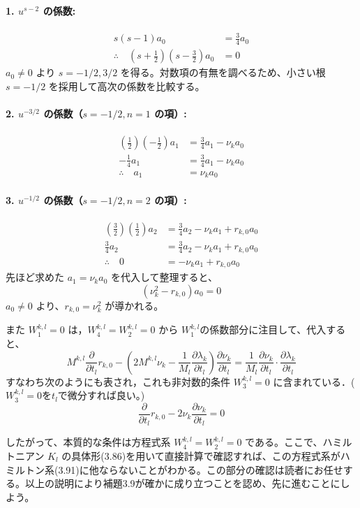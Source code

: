 \paragraph{1. $u^{s-2}$ の係数:}
\begin{align*}
    s(s-1) a_0 &= \frac{3}{4} a_0 \\
    \therefore \quad \left(s + \frac{1}{2}\right)\left(s - \frac{3}{2}\right) a_0 &= 0
\end{align*}
$a_0 \neq 0$ より $s = -1/2, 3/2$ を得る。対数項の有無を調べるため、小さい根 $s = -1/2$ を採用して高次の係数を比較する。

\paragraph{2. $u^{-3/2}$ の係数（$s=-1/2, n=1$ の項）:}
\begin{align*}
    \left(\frac{1}{2}\right)\left(-\frac{1}{2}\right) a_1 &= \frac{3}{4} a_1 - \nu_k a_0 \\
    -\frac{1}{4} a_1 &= \frac{3}{4} a_1 - \nu_k a_0 \\
    \therefore \quad a_1 &= \nu_k a_0
\end{align*}

\paragraph{3. $u^{-1/2}$ の係数（$s=-1/2, n=2$ の項）:}
\begin{align*}
    \left(\frac{3}{2}\right)\left(\frac{1}{2}\right) a_2 &= \frac{3}{4} a_2 - \nu_k a_1 + r_{k,0} a_0 \\
    \frac{3}{4} a_2 &= \frac{3}{4} a_2 - \nu_k a_1 + r_{k,0} a_0 \\
    \therefore \quad 0 &= -\nu_k a_1 + r_{k,0} a_0
\end{align*}
先ほど求めた $a_1 = \nu_k a_0$ を代入して整理すると、
\begin{equation*}
    (\nu_k^2 - r_{k,0}) a_0 = 0
\end{equation*}
$a_0 \neq 0$ より、$r_{k,0} = \nu_k^2$ が導かれる。
\begin{story}
また $W_1^{k,l}=0$ は，$W_4^{k,l}=W_2^{k,l}=0$ から $W_1^{k,l}$の係数部分に注目して、代入すると、
\[
    M^{k,l} \frac{\partial}{\partial t_l} r_{k,0} - \left( 2M^{k,l}\nu_k - \frac{1}{M_l} \frac{\partial \lambda_k}{\partial t_l} \right) \frac{\partial \nu_k}{\partial t_l} = \frac{1}{M_l} \frac{\partial \nu_k}{\partial t_l} \cdot \frac{\partial \lambda_k}{\partial t_l}
\]
すなわち次のようにも表され，これも非対数的条件 $W_3^{k,l}=0$ に含まれている．($W_3^{k,l}=0$を$t_{l}$で微分すれば良い。)
\begin{equation}
    \frac{\partial}{\partial t_l} r_{k,0} - 2\nu_k \frac{\partial \nu_k}{\partial t_l} = 0 \label{eq:rk0_derivative}
\end{equation}

したがって、本質的な条件は方程式系 $W_4^{k,l} = W_2^{k,l} = 0$ である。ここで、ハミルトニアン $K_l$ の具体形(3.86)を用いて直接計算で確認すれば、この方程式系がハミルトン系(3.91)に他ならないことがわかる。この部分の確認は読者にお任せする。以上の説明により補題3.9が確かに成り立つことを認め、先に進むことにしよう。
\end{story}

